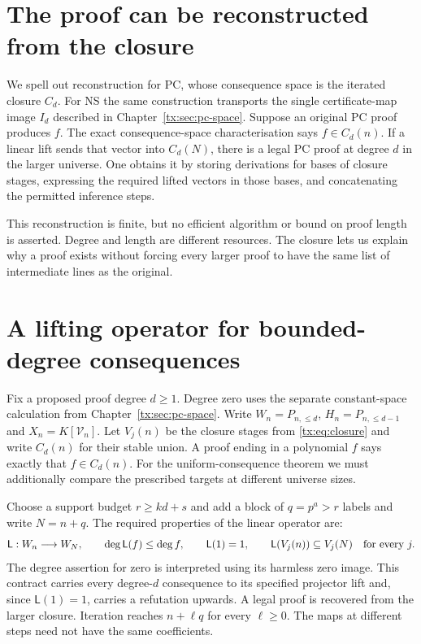 \section{The proof can be reconstructed from the closure}
We spell out reconstruction for PC, whose consequence space is the
iterated closure $C_d$. For NS the same construction transports the
single certificate-map image $I_d$ described in
Chapter~\ref{tx:sec:pc-space}.
Suppose an original PC proof produces $f$. The exact consequence-space
characterisation says $f\in C_d(n)$. If a linear lift sends that vector
into $C_d(N)$, there is a legal PC proof at degree $d$ in the larger
universe. One obtains it by storing derivations for bases of closure
stages, expressing the required lifted vectors in those bases, and
concatenating the permitted inference steps.

This reconstruction is finite, but no efficient algorithm or bound on
proof length is asserted. Degree and length are different resources.
The closure lets us explain why a proof exists without forcing every
larger proof to have the same list of intermediate lines as the original.

\section{A lifting operator for bounded-degree consequences}
Fix a proposed proof degree $d\ge1$. Degree zero uses the separate constant-space calculation from Chapter~\ref{tx:sec:pc-space}. Write $W_n=P_{n,\le d}$,
$H_n=P_{n,\le d-1}$ and $X_n=K[\mathcal V_n]$.
Let $V_j(n)$ be the closure stages from \eqref{tx:eq:closure} and write
$C_d(n)$ for their stable union. A proof ending in a polynomial $f$ says exactly that
$f\in C_d(n)$. For the uniform-consequence theorem we must additionally
compare the prescribed targets at different universe sizes.

Choose a support budget $r\ge kd+s$ and add a block of $q=p^a>r$ labels and write $N=n+q$.
The required properties of the linear operator are:
\begin{equation}\label{tx:eq:newcontract}
 \mathsf L:W_n\longrightarrow W_N,\qquad
 \deg\mathsf L(f)\le\deg f,\qquad \mathsf L(1)=1,\qquad
 \mathsf L(V_j(n))\subseteq V_j(N)\quad\hbox{for every }j.
\end{equation}
The degree assertion for zero is interpreted using its harmless zero
image. This contract carries every degree-$d$ consequence to its specified
projector lift and, since $\mathsf L(1)=1$, carries a refutation
upwards. A legal proof is recovered from the larger closure. Iteration reaches $n+\ell q$ for every $\ell\ge0$.
The maps at different steps need not have the same coefficients.


